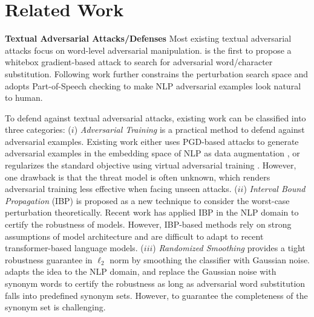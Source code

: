 \documentclass{article} \usepackage{iclr2021_conference,times}
\theoremstyle{definition}
\theoremstyle{remark}
\begin{document}
\section{Related Work}
\vspace{-1mm}


\textbf{Textual Adversarial Attacks/Defenses} Most existing textual adversarial attacks focus on word-level adversarial manipulation. \citet{hotflip} is the first to propose a whitebox gradient-based attack to search for adversarial word/character substitution. Following work \citep{DBLP:conf/emnlp/AlzantotSEHSC18, weight_attack, comattack, textfooler} further constrains the perturbation search space and adopts Part-of-Speech checking to make NLP adversarial examples look natural to human. 

To defend against textual adversarial attacks, existing work can be classified into three categories:
($i$) \textit{Adversarial Training} is a practical method to defend against adversarial examples. Existing work either uses PGD-based attacks to generate adversarial examples in the embedding space of NLP as data augmentation \citep{freelb}, or regularizes the standard objective using virtual adversarial training \citep{smart,alum,gan2020large}. However, one drawback is that the threat model is often unknown, which renders adversarial training less effective when facing unseen attacks.
($ii$) \textit{Interval Bound Propagation} (IBP) \citep{ibp} is proposed as a new technique to consider the worst-case perturbation theoretically. Recent work \citep{ibp1,ibp2} has applied IBP in the NLP domain to certify the robustness of models. However, IBP-based methods rely on strong assumptions of model architecture and are difficult to adapt to recent transformer-based language models. 
($iii$) \textit{Randomized Smoothing} \citep{DBLP:conf/icml/CohenRK19} provides a tight robustness guarantee in $\ell_2$ norm by smoothing the classifier with Gaussian noise. \citet{safer} adapts the idea to the NLP domain, and replace the Gaussian noise with synonym words to certify the robustness as long as adversarial word substitution falls into predefined synonym sets. However, to guarantee the completeness of the synonym set is challenging.
\end{document}

